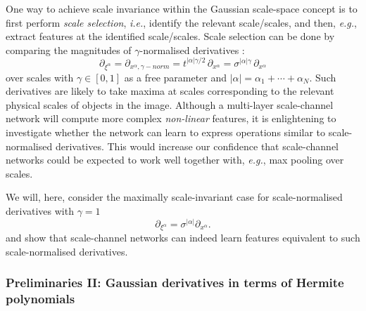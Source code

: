 \documentclass[twocolumn,runningheads]{svjour3}
\begin{document}
One way to achieve scale invariance within the Gaussian scale-space concept is to first perform \emph{scale
	selection}, {\em i.e.\/}, identify the relevant scale/scales, and then, {\em e.g.\/}, extract features at the identified
scale/scales. Scale selection can be done by comparing the magnitudes of
$\gamma$-normalised derivatives \cite{Lin97-IJCV,Lin98-IJCV}:
\begin{equation}
\partial_{\xi^{\alpha}} = \partial_{x^\alpha, \gamma-norm} = t^{|\alpha|\gamma/2} \, \partial_{x^{\alpha}} = \sigma^{|\alpha| \gamma} \, \partial_{x^{\alpha}} 
\end{equation}
over scales with $\gamma \in [0,1 ]$ as a free parameter and $|\alpha| = \alpha_1
+ \cdots + \alpha_N$. Such derivatives are likely to take maxima
at scales corresponding to the relevant physical scales of objects in
the image.
Although a multi-layer scale-channel network will compute more
complex {\em non-linear\/} features, it is enlightening to investigate whether
the network can learn to express operations similar to scale-normalised derivatives. This would increase our
confidence that scale-channel networks could be expected to work well
together with, {\em e.g.\/}, max pooling over scales.

We will, here, consider the maximally scale-invariant case for scale-normalised derivatives with $\gamma=1$ 
\begin{equation}
\partial_{\xi^{\alpha}} = \sigma^{|\alpha|}  \partial_{x^\alpha}.
\end{equation}
and show that scale-channel networks can indeed learn features equivalent to
such scale-normalised derivatives. 

\subsubsection{Preliminaries II: Gaussian derivatives in terms of Hermite polynomials}
\end{document}
